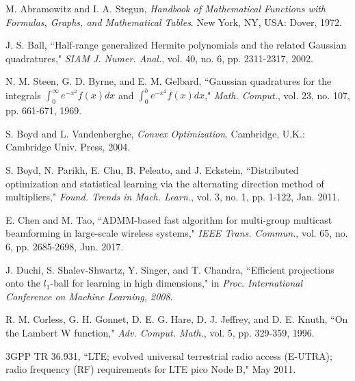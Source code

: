 \documentclass[journal]{IEEEtran}
\begin{document}
\begin{thebibliography}{1}
 M. Abramowitz and I. A. Stegun, \emph{Handbook of Mathematical Functions with Formulas, Graphs, and Mathematical Tables}. New York, NY, USA: Dover, 1972.

 J. S. Ball, ``Half-range generalized Hermite polynomials and the related Gaussian quadratures," \emph{SIAM J. Numer. Anal.}, vol. 40, no. 6, pp. 2311-2317, 2002.

 N. M. Steen, G. D. Byrne, and E. M. Gelbard, ``Gaussian quadratures for the integrals $\int_{0}^{\infty} e^{-x^2}f\left(x\right) dx$ and $\int_{0}^{b}e^{-x^2}f\left(x\right)dx$," \emph{Math. Comput.}, vol. 23, no. 107, pp. 661-671, 1969.

 S. Boyd and L. Vandenberghe, \emph{Convex Optimization}. Cambridge, U.K.: Cambridge Univ. Press, 2004.

 S. Boyd, N. Parikh, E. Chu, B. Peleato, and J. Eckstein, ``Distributed optimization and statistical learning via the alternating direction method of multipliers," \emph{Found. Trends in Mach. Learn.}, vol. 3, no. 1, pp. 1-122, Jan. 2011.

 E. Chen and M. Tao, ``ADMM-based fast algorithm for multi-group multicast beamforming in large-scale wireless systems," \emph{IEEE Trans. Commun.}, vol. 65, no. 6, pp. 2685-2698, Jun. 2017.

 J. Duchi, S. Shalev-Shwartz, Y. Singer, and T. Chandra, ``Efficient projections onto the $l_1$-ball for learning in high dimensions," in \emph{Proc. International Conference on Machine Learning, 2008}.

 R. M. Corless, G. H. Gonnet, D. E. G. Hare, D. J. Jeffrey, and D. E. Knuth, ``On the Lambert W function," \emph{Adv. Comput. Math.}, vol. 5, pp. 329-359, 1996.

 3GPP TR 36.931, ``LTE; evolved universal terrestrial radio access (E-UTRA); radio frequency (RF) requirements for LTE pico Node B,"
    May 2011.

\end{thebibliography}
\end{document}

